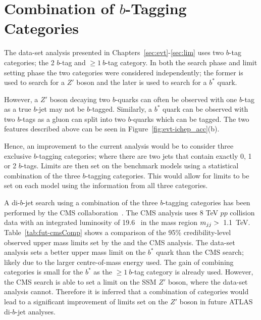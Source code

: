 \section{Combination of $b$-Tagging Categories}

The \summer{} data-set analysis presented in Chapters~\ref{sec:evt}-\ref{sec:lim} uses
two $b$-tag categories; the 2 $b$-tag and $\geq1~b$-tag category.
In both the search phase and limit setting phase the two categories were considered independently;
the former is used to search for a $Z'$ boson and the later is used to search for a $b^{*}$ quark.

However, a $Z'$ boson decaying two $b$-quarks can often be observed with one $b$-tag as a true $b$-jet may not be $b$-tagged.
Similarly, a $b^*$ quark can be observed with two $b$-tags as a gluon can split into two $b$-quarks which can be tagged.
The two features described above can be seen in Figure~\ref{fig:evt-ichep_acc}(b).

Hence, an improvement to the current analysis would be to consider three exclusive $b$-tagging categories;
where there are two jets that contain exactly 0, 1 or 2 $b$-tags.
Limits are then set on the benchmark models using a statistical combination of the three $b$-tagging categories.
This would allow for limits to be set on each model using the information from all three categories.

A di-$b$-jet search using a combination of the three $b$-tagging categories has been performed  by the CMS collaboration~\cite{dibjet-cms}.
The CMS analysis uses 8 TeV $pp$ collision data with an integrated luminosity of 19.6~\ifb{} in the mass region $m_{jj}>$~1.1~TeV.
Table~\ref{tab:fut-cmsComp} shows a comparison of the 95\% credibility-level observed upper mass limits set by the \summer{} and the CMS analysis.
The \summer{} data-set analysis sets a better upper mass limit on the $b^*$ quark than the CMS search;
likely due to the larger centre-of-mass energy used. The gain of combining categories is small for the $b^*$ as the $\geq1~b$-tag category is already used.
However, the CMS search is able to set a limit on the SSM $Z'$ boson, where the \summer{} data-set analysis cannot.
Therefore it is inferred that a combination of categories would lead to a significant improvement of limits set on the $Z'$ boson in future ATLAS di-$b$-jet analyses.

